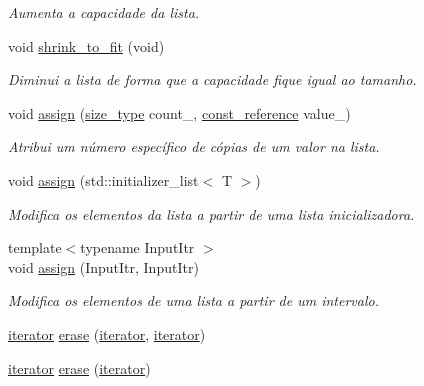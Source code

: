 \begin{DoxyCompactItemize}
\begin{DoxyCompactList}\small\item\em Aumenta a capacidade da lista. \end{DoxyCompactList}\item 
void \hyperlink{classsc_1_1vector_a9468a8d103dfe4b4979d26668cab9c63}{shrink\+\_\+to\+\_\+fit} (void)
\begin{DoxyCompactList}\small\item\em Diminui a lista de forma que a capacidade fique igual ao tamanho. \end{DoxyCompactList}\item 
void \hyperlink{classsc_1_1vector_a6295cd66e564a954bc384fc016dc80a0}{assign} (\hyperlink{classsc_1_1vector_a48bf37ba1a6d0c13504414d86e27c399}{size\+\_\+type} count\+\_\+, \hyperlink{classsc_1_1vector_a8da2b1a11b069241100f9b2e14f481a0}{const\+\_\+reference} value\+\_\+)
\begin{DoxyCompactList}\small\item\em Atribui um número específico de cópias de um valor na lista. \end{DoxyCompactList}\item 
void \hyperlink{classsc_1_1vector_a87df3c4e180760eaf49a64fb0b470aef}{assign} (std\+::initializer\+\_\+list$<$ T $>$)
\begin{DoxyCompactList}\small\item\em Modifica os elementos da lista a partir de uma lista inicializadora. \end{DoxyCompactList}\item 
{\footnotesize template$<$typename Input\+Itr $>$ }\\void \hyperlink{classsc_1_1vector_aa9429f55d5ca3f7916fffa4e654d35dc}{assign} (Input\+Itr, Input\+Itr)
\begin{DoxyCompactList}\small\item\em Modifica os elementos de uma lista a partir de um intervalo. \end{DoxyCompactList}\item 
\hyperlink{classsc_1_1vector_a9e5d5cc35e379aa27a93989f4a71413c}{iterator} \hyperlink{classsc_1_1vector_a916036c5dc2ec3dacea42f08706bce33}{erase} (\hyperlink{classsc_1_1vector_a9e5d5cc35e379aa27a93989f4a71413c}{iterator}, \hyperlink{classsc_1_1vector_a9e5d5cc35e379aa27a93989f4a71413c}{iterator})
\item 
\hyperlink{classsc_1_1vector_a9e5d5cc35e379aa27a93989f4a71413c}{iterator} \hyperlink{classsc_1_1vector_a1671cc04a48cfbf8b3baf2c6274aa44d}{erase} (\hyperlink{classsc_1_1vector_a9e5d5cc35e379aa27a93989f4a71413c}{iterator})

\end{DoxyCompactItemize}
